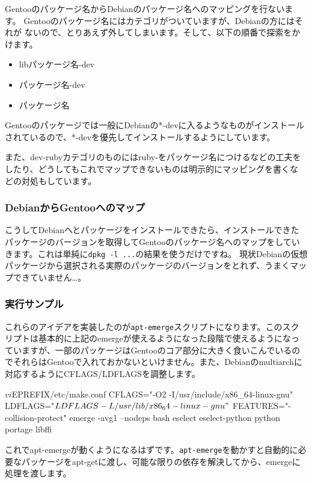 \documentclass[mingoth,a4paper]{jsarticle}
\begin{document}
Gentooのパッケージ名からDebianのパッケージ名へのマッピングを行ないます。
Gentooのパッケージ名にはカテゴリがついていますが、Debianの方にはそれが
ないので、とりあえず外してしまいます。そして、以下の順番で探索をかけます。

\begin{itemize}
\item libパッケージ名-dev
\item パッケージ名-dev
\item パッケージ名
\end{itemize}

Gentooのパッケージでは一般にDebianの*-devに入るようなものがインストール
されているので、*-devを優先してインストールするようにしています。

また、dev-rubyカテゴリのものにはruby-をパッケージ名につけるなどの工夫を
したり、どうしてもこれでマップできないものは明示的にマッピングを書くな
どの対処もしています。

\subsubsection{DebianからGentooへのマップ}

こうしてDebianへとパッケージをインストールできたら、インストールできた
パッケージのバージョンを取得してGentooのパッケージ名へのマップをしてい
きます。これは単純に\texttt{dpkg -l ...}の結果を使うだけですね。
現状Debianの仮想
パッケージから選択される実際のパッケージのバージョンをとれず、うまくマッ
プできていません…。

\subsubsection{実行サンプル}

これらのアイデアを実装したのが\texttt{apt-emerge}スクリプトになります。このスク
リプトは基本的に上記のemergeが使えるようになった段階で使えるようになっ
ていますが、一部のパッケージはGentooのコア部分に大きく食いこんでいるの
でそれらはGentooで入れておかないといけません。また、Debianのmultiarchに
対応するようにCFLAGS/LDFLAGSを調整します。

\begin{commandline}
$ vi $EPREFIX/etc/make.conf
CFLAGS="-O2 -I/usr/include/x86_64-linux-gnu"
LDFLAGS="${LDFLAGS} -L/usr/lib/x86_64-linux-gnu"
$ FEATURES="-collision-protect" emerge -avg1 --nodeps bash eselect eselect-python python portage libffi
\end{commandline}

これでapt-emergeが動くようになるはずです。\texttt{apt-emerge}を動かすと自動的に必要なパッケージをapt-getに渡し、可能な限りの依存を解決してから、emergeに処理を渡します。
\end{document}
